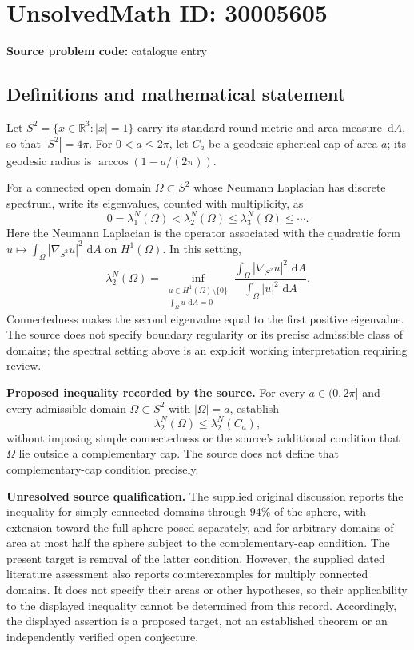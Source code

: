 \documentclass[11pt]{article}
\newcommand{\R}{\mathbb{R}}
\newcommand{\dd}{\,\mathrm{d}}
\begin{document}
\section*{UnsolvedMath ID: 30005605}
\textbf{Source problem code:} catalogue entry
\subsection{Definitions and mathematical statement}
Let \(S^2=\{x\in\R^3:|x|=1\}\) carry its standard round metric and area measure \(\dd A\), so that \(|S^2|=4\pi\). For \(0<a\leq 2\pi\), let \(C_a\) be a geodesic spherical cap of area \(a\); its geodesic radius is \(\arccos(1-a/(2\pi))\).

For a connected open domain \(\Omega\subset S^2\) whose Neumann Laplacian has discrete spectrum, write its eigenvalues, counted with multiplicity, as
\[
0=\lambda_1^N(\Omega)<\lambda_2^N(\Omega)\leq\lambda_3^N(\Omega)\leq\cdots.
\]
Here the Neumann Laplacian is the operator associated with the quadratic form \(u\mapsto\int_\Omega |\nabla_{S^2}u|^2\,\dd A\) on \(H^1(\Omega)\). In this setting,
\[
\lambda_2^N(\Omega)=\inf_{\substack{u\in H^1(\Omega)\setminus\{0\}\\ \int_\Omega u\,\dd A=0}}
\frac{\int_\Omega |\nabla_{S^2}u|^2\,\dd A}{\int_\Omega |u|^2\,\dd A}.
\]
Connectedness makes the second eigenvalue equal to the first positive eigenvalue. The source does not specify boundary regularity or its precise admissible class of domains; the spectral setting above is an explicit working interpretation requiring review.

\textbf{Proposed inequality recorded by the source.} For every \(a\in(0,2\pi]\) and every admissible domain \(\Omega\subset S^2\) with \(|\Omega|=a\), establish
\[
\lambda_2^N(\Omega)\leq\lambda_2^N(C_a),
\]
without imposing simple connectedness or the source's additional condition that \(\Omega\) lie outside a complementary cap. The source does not define that complementary-cap condition precisely.

\textbf{Unresolved source qualification.} The supplied original discussion reports the inequality for simply connected domains through \(94\%\) of the sphere, with extension toward the full sphere posed separately, and for arbitrary domains of area at most half the sphere subject to the complementary-cap condition. The present target is removal of the latter condition. However, the supplied dated literature assessment also reports counterexamples for multiply connected domains. It does not specify their areas or other hypotheses, so their applicability to the displayed inequality cannot be determined from this record. Accordingly, the displayed assertion is a proposed target, not an established theorem or an independently verified open conjecture.
\end{document}
